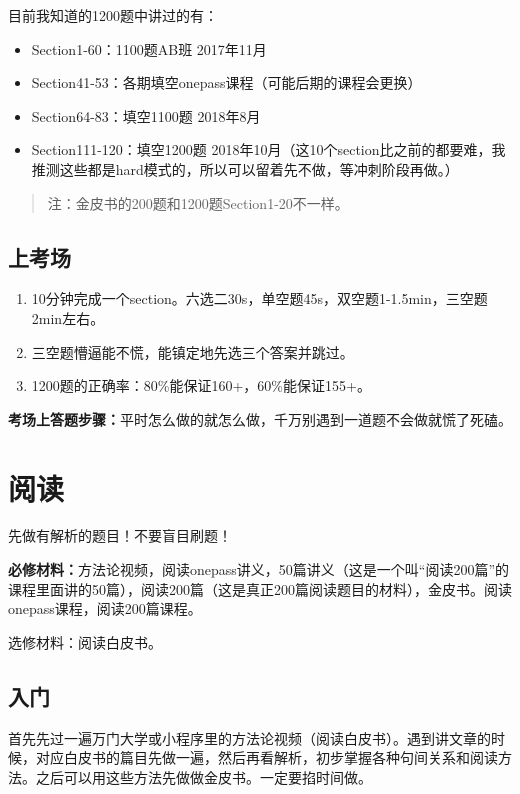 \documentclass[cn,plain]{./src/qyxfbook}
\newenvironment{material}{\begin{tcolorbox}[title={材料}]}{\end{tcolorbox}}
\begin{document}
目前我知道的1200题中讲过的有：
\begin{itemize}
    \item Section1-60：1100题AB班 2017年11月
    \item Section41-53：各期填空onepass课程（可能后期的课程会更换）
    \item Section64-83：填空1100题 2018年8月
    \item Section111-120：填空1200题 2018年10月（这10个section比之前的都要难，我推测这些都是hard模式的，所以可以留着先不做，等冲刺阶段再做。）
\end{itemize}

\begin{quote}
注：金皮书的200题和1200题Section1-20不一样。
\end{quote}

\subsection{上考场}
\begin{enumerate}
    \item 10分钟完成一个section。六选二30s，单空题45s，双空题1-1.5min，三空题
2min左右。
    \item 三空题懵逼能不慌，能镇定地先选三个答案并跳过。
    \item 1200题的正确率：80\%能保证160+，60\%能保证155+。
\end{enumerate}

\textbf{考场上答题步骤：}平时怎么做的就怎么做，千万别遇到一道题不会做就慌了死磕。

\section{阅读}
先做有解析的题目！不要盲目刷题！

\begin{material}
\textbf{必修材料：}方法论视频，阅读onepass讲义，50篇讲义（这是一个叫``阅读200篇''的课程里面讲的50篇），阅读200篇（这是真正200篇阅读题目的材料），金皮书。阅读onepass课程，阅读200篇课程。

选修材料：阅读白皮书。
\end{material}

\subsection{入门}
首先先过一遍万门大学或小程序里的方法论视频（阅读白皮书）。遇到讲文章的时候，对应白皮书的篇目先做一遍，然后再看解析，初步掌握各种句间关系和阅读方法。之后可以用这些方法先做做金皮书。一定要掐时间做。
\end{document}
